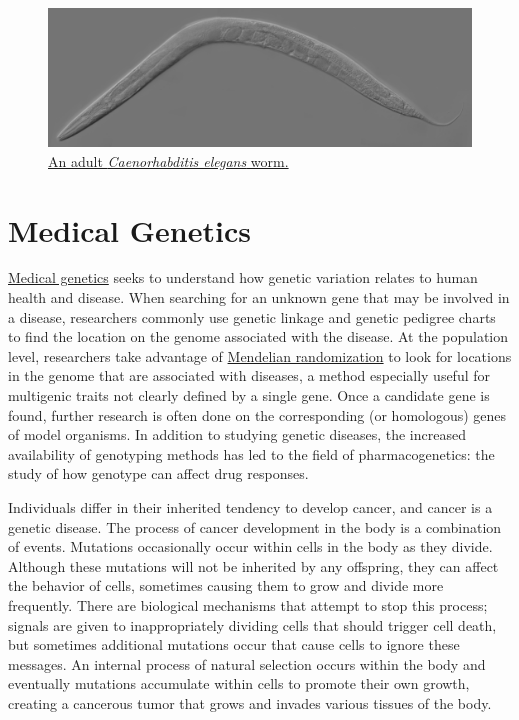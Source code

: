\begin{figure}

{\centering \includegraphics[width=0.7\linewidth]{./figures/genetics/Adult_Caenorhabditis_elegans} 

}

\caption{\href{https://commons.wikimedia.org/wiki/File:Adult_Caenorhabditis_elegans.jpg}{An adult \emph{Caenorhabditis elegans} worm.}}\label{fig:celegans}
\end{figure}

\hypertarget{medical-genetics}{%
\section{Medical Genetics}\label{medical-genetics}}

\href{https://en.wikipedia.org/wiki/Medical_genetics}{Medical genetics} seeks to understand how genetic variation relates to human health and disease. When searching for an unknown gene that may be involved in a disease, researchers commonly use genetic linkage and genetic pedigree charts to find the location on the genome associated with the disease. At the population level, researchers take advantage of \href{https://en.wikipedia.org/wiki/Mendelian_randomization}{Mendelian randomization} to look for locations in the genome that are associated with diseases, a method especially useful for multigenic traits not clearly defined by a single gene. Once a candidate gene is found, further research is often done on the corresponding (or homologous) genes of model organisms. In addition to studying genetic diseases, the increased availability of genotyping methods has led to the field of pharmacogenetics: the study of how genotype can affect drug responses.

Individuals differ in their inherited tendency to develop cancer, and cancer is a genetic disease. The process of cancer development in the body is a combination of events. Mutations occasionally occur within cells in the body as they divide. Although these mutations will not be inherited by any offspring, they can affect the behavior of cells, sometimes causing them to grow and divide more frequently. There are biological mechanisms that attempt to stop this process; signals are given to inappropriately dividing cells that should trigger cell death, but sometimes additional mutations occur that cause cells to ignore these messages. An internal process of natural selection occurs within the body and eventually mutations accumulate within cells to promote their own growth, creating a cancerous tumor that grows and invades various tissues of the body.

